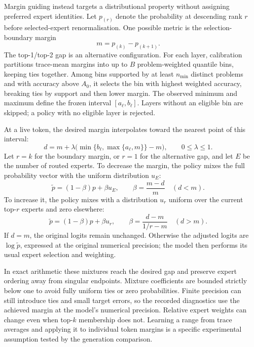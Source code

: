 \documentclass[12pt,a4paper,twoside,openright]{book}
\begin{document}
Margin guiding instead targets a distributional property without assigning
preferred expert identities. Let $p_{(r)}$ denote the probability at descending
rank $r$ before selected-expert renormalisation. One possible metric is the
selection-boundary margin
\begin{equation}
  m=p_{(k)}-p_{(k+1)}.
\end{equation}
The top-1/top-2 gap is an alternative configuration. For each layer,
calibration partitions trace-mean margins into up to $B$ problem-weighted
quantile bins, keeping ties together. Among bins supported by at least
$n_{\min}$ distinct problems and with accuracy above $A_0$, it selects the bin with
highest weighted accuracy, breaking ties by support and then lower margin.
The observed minimum and maximum define the frozen interval $[a_\ell,b_\ell]$.
Layers without an eligible bin are skipped; a policy with no eligible layer
is rejected.

At a live token, the desired margin interpolates toward the nearest point
of this interval:
\begin{equation}
  d=m+\lambda\bigl(\min\{b_\ell,\max\{a_\ell,m\}\}-m\bigr),
  \qquad 0\leq\lambda\leq1.
\end{equation}
Let $r=k$ for the boundary margin, or $r=1$ for the alternative gap, and let
$E$ be the number of routed experts. To decrease the margin, the policy mixes
the full probability vector with the uniform distribution $u_E$:
\begin{equation}
  \widetilde p=(1-\beta)p+\beta u_E,
  \qquad \beta=\frac{m-d}{m}\quad(d<m).
\end{equation}
To increase it, the policy mixes with a distribution $u_r$ uniform over the
current top-$r$ experts and zero elsewhere:
\begin{equation}
  \widetilde p=(1-\beta)p+\beta u_r,
  \qquad \beta=\frac{d-m}{1/r-m}\quad(d>m).
\end{equation}
If $d=m$, the original logits remain unchanged. Otherwise the adjusted
logits are $\log\widetilde p$, expressed at the original numerical precision;
the model then performs its usual expert selection and weighting.

In exact arithmetic these mixtures reach the desired gap and preserve expert
ordering away from singular endpoints. Mixture coefficients are bounded
strictly below one to avoid fully uniform ties or zero probabilities.
Finite precision can still introduce ties and small target errors, so the
recorded diagnostics use the achieved margin at the model's numerical
precision. Relative expert
weights can change even when top-$k$ membership does not. Learning a range
from trace averages and applying it to individual token margins is a specific
experimental assumption tested by the generation comparison.
\end{document}
